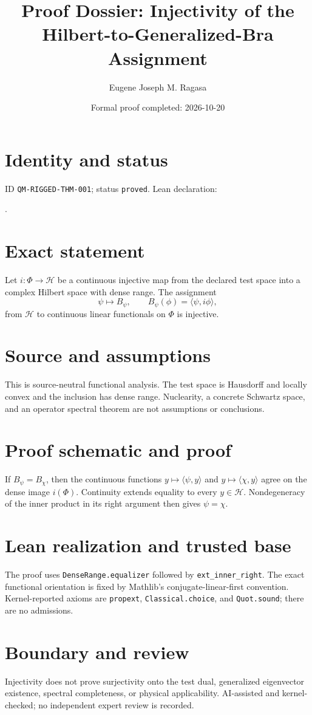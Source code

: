 \documentclass[11pt]{article}
\title{Proof Dossier: Injectivity of the Hilbert-to-Generalized-Bra Assignment}\author{Eugene Joseph M. Ragasa}\date{Formal proof completed: 2026-10-20}
\begin{document}
\maketitle
\section{Identity and status}
ID \texttt{QM-RIGGED-THM-001}; status \texttt{proved}. Lean declaration:
\par{}.
\section{Exact statement}
Let $i:\Phi\to\mathcal H$ be a continuous injective map from the declared test space into a
complex Hilbert space with dense range. The assignment
\[\psi\longmapsto B_\psi,\qquad B_\psi(\phi)=\langle\psi,i\phi\rangle,
\]
from $\mathcal H$ to continuous linear functionals on $\Phi$ is injective.
\section{Source and assumptions}
This is source-neutral functional analysis. The test space is Hausdorff and locally convex and the
inclusion has dense range. Nuclearity, a concrete Schwartz space, and an operator spectral theorem
are not assumptions or conclusions.
\section{Proof schematic and proof}
If $B_\psi=B_\chi$, then the continuous functions
$y\mapsto\langle\psi,y\rangle$ and $y\mapsto\langle\chi,y\rangle$ agree on the dense image
$i(\Phi)$. Continuity extends equality to every $y\in\mathcal H$. Nondegeneracy of the inner
product in its right argument then gives $\psi=\chi$.
\section{Lean realization and trusted base}
The proof uses \texttt{DenseRange.equalizer} followed by \texttt{ext\_inner\_right}. The exact
functional orientation is fixed by Mathlib's conjugate-linear-first convention. Kernel-reported
axioms are \texttt{propext}, \texttt{Classical.choice}, and \texttt{Quot.sound}; there are no
admissions.
\section{Boundary and review}
Injectivity does not prove surjectivity onto the test dual, generalized eigenvector existence,
spectral completeness, or physical applicability. AI-assisted and kernel-checked; no independent
expert review is recorded.
\end{document}
